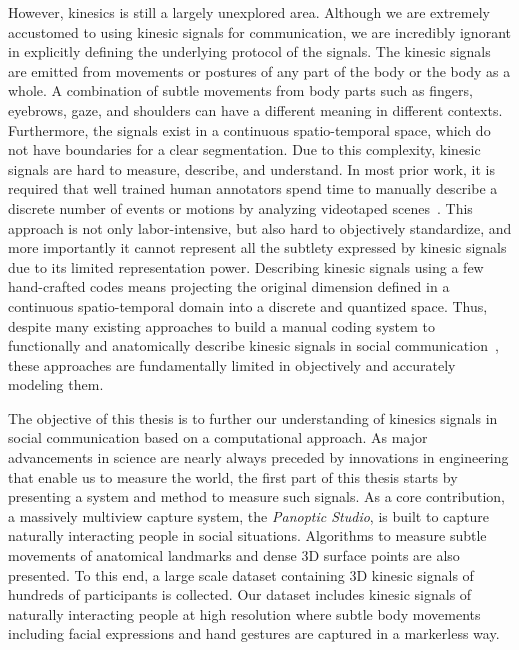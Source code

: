 However, kinesics is still a largely unexplored area. Although we are extremely accustomed to using kinesic signals for communication, we are incredibly ignorant in explicitly defining the underlying protocol of the signals. The kinesic signals are emitted from movements or postures of any part of the body or the body as a whole. A combination of subtle movements from body parts such as fingers, eyebrows, gaze, and shoulders can have a different meaning in different contexts. Furthermore, the signals exist in a continuous spatio-temporal space, which do not have boundaries for a clear segmentation. Due to this complexity, kinesic signals are hard to measure, describe, and understand. In most prior work, it is required that well trained human annotators spend time to manually describe a discrete number of events or motions by analyzing videotaped scenes~\cite{harrigan2013methodology, dael2015measuring}. This approach is not only labor-intensive, but also hard to objectively standardize, and more importantly it cannot represent all the subtlety expressed by kinesic signals due to its limited representation power. Describing kinesic signals using a few hand-crafted codes means projecting the original dimension defined in a continuous spatio-temporal domain into a discrete and quantized space. Thus, despite many existing approaches to build a manual coding system to functionally and anatomically describe kinesic signals in social communication~\cite{Ekman-1977, van2014body, harrigan2013methodology, dael2015measuring}, these approaches are fundamentally limited in objectively and accurately modeling them. 

The objective of this thesis is to further our understanding of kinesics signals in social communication based on a computational approach. As major advancements in science are nearly always preceded by innovations in engineering that enable us to measure the world, the first part of this thesis starts by presenting a system and method to measure such signals. As a core contribution, a massively multiview capture system, the \emph{Panoptic Studio}, is built to capture naturally interacting people in social situations. Algorithms to measure subtle movements of anatomical landmarks and dense 3D surface points are also presented. To this end, a large scale dataset containing 3D kinesic signals of hundreds of participants is collected. Our dataset includes kinesic signals of naturally interacting people at high resolution where subtle body movements  including facial expressions and hand gestures are captured in a markerless way. %


